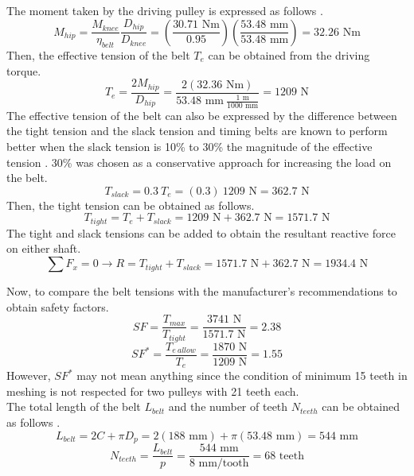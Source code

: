 The moment taken by the driving pulley is expressed as follows \cite{gates_mectrol_timing_2006}.
\begin{equation}
    M_{hip} = \frac{M_{knee}}{\eta_{belt}}\frac{D_{hip}}{D_{knee}} = \left(\frac{30.71 \text{ Nm}}{0.95}\right)\left(\frac{53.48\text{ mm}}{53.48\text{ mm}}\right) = 32.26 \text{ Nm}
\end{equation}
Then, the effective tension of the belt $T_e$ can be obtained from the driving torque.
\begin{equation}
    T_e = \frac{2M_{hip}}{D_{hip}} = \frac{2(32.36 \text{ Nm})}{53.48 \text{ mm}\ \frac{1\text{ m}}{1000\text{ mm}}} = 1209\text{ N}  
\end{equation}
The effective tension of the belt can also be expressed by the difference between the tight tension and the slack tension and timing belts are known to perform better when the slack tension is 10\% to 30\% the magnitude of the effective tension \cite{gates_mectrol_timing_2006}. 30\% was chosen as a conservative approach for increasing the load on the belt.
\begin{equation}
    T_{slack} = 0.3 \ T_e = (0.3)\ 1209 \text{ N} = 362.7 \text{ N}
\end{equation}
Then, the tight tension can be obtained as follows.
\begin{equation}
    T_{tight} = T_e + T_{slack} = 1209\text{ N} + 362.7\text{ N} = 1571.7\text{ N}
\end{equation}
The tight and slack tensions can be added to obtain the resultant reactive force on either shaft.
\begin{equation}
    \sum F_x = 0 \longrightarrow R = T_{tight} + T_{slack} = 1571.7\text{ N} + 362.7\text{ N} = 1934.4\text{ N}
\end{equation}

Now, to compare the belt tensions with the manufacturer's recommendations to obtain safety factors.
\begin{equation}
    SF = \frac{T_{max}}{T_{tight}} = \frac{3741\text{ N}}{1571.7\text{ N}} = 2.38
\end{equation}
\begin{equation}
    SF^* = \frac{T_{e\ allow}}{T_e} = \frac{1870\text{ N}}{1209\text{ N}} = 1.55
\end{equation}
However, $SF^*$ may not mean anything since the condition of minimum 15 teeth in meshing is not respected for two pulleys with 21 teeth each.\\

The total length of the belt $L_{belt}$ and the number of teeth $N_{teeth}$ can be obtained as follows \cite{gates_mectrol_timing_2006}.
\begin{equation}
    L_{belt} = 2C + \pi D_p = 2(188\text{ mm}) + \pi(53.48\text{ mm}) = 544\text{ mm}
\end{equation}
\begin{equation}
    N_{teeth} = \frac{L_{belt}}{p} = \frac{544\text{ mm}}{8\text{ mm/tooth}} = 68\text{ teeth}
\end{equation}

